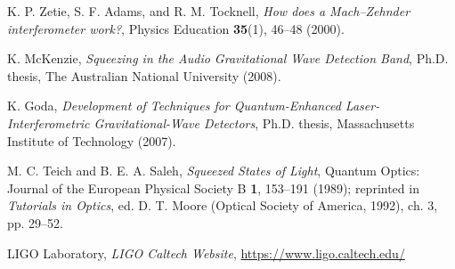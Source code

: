 \documentclass[colorlinks=true,pdfstartview=FitV,linkcolor=blue,
citecolor=red,urlcolor=magenta]{ligodoc}
\begin{document}


\begin{thebibliography}{9}

K. P. Zetie, S. F. Adams, and R. M. Tocknell, 
\emph{How does a Mach–Zehnder interferometer work?}, 
Physics Education \textbf{35}(1), 46–48 (2000).

K. McKenzie, 
\emph{Squeezing in the Audio Gravitational Wave Detection Band}, 
Ph.D. thesis, The Australian National University (2008).

K. Goda, 
\emph{Development of Techniques for Quantum-Enhanced Laser-Interferometric Gravitational-Wave Detectors}, 
Ph.D. thesis, Massachusetts Institute of Technology (2007).

M. C. Teich and B. E. A. Saleh, 
\emph{Squeezed States of Light}, 
Quantum Optics: Journal of the European Physical Society B \textbf{1}, 153–191 (1989); reprinted in \emph{Tutorials in Optics}, ed. D. T. Moore (Optical Society of America, 1992), ch. 3, pp. 29–52.

LIGO Laboratory, \emph{LIGO Caltech Website}, \url{https://www.ligo.caltech.edu/}

\end{thebibliography}
\end{document}
